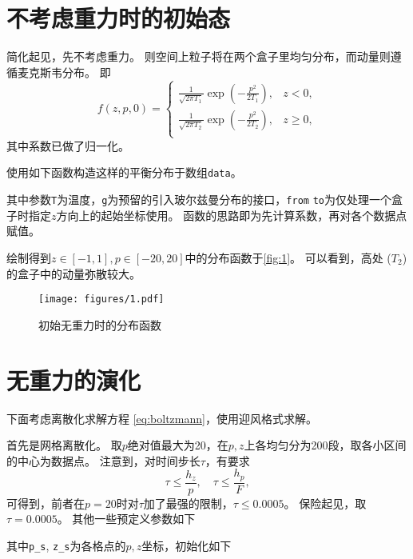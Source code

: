 \documentclass[a4paper,unicode]{report}
\begin{document}
\section{不考虑重力时的初始态}
简化起见，先不考虑重力。
则空间上粒子将在两个盒子里均匀分布，而动量则遵循麦克斯韦分布。
即
\begin{equation}
    f(z, p, 0) = \begin{cases}
        \frac{1}{\sqrt{2\pi T_1}}\exp(-\frac{p^2}{2T_1}), & z < 0,\\
        \frac{1}{\sqrt{2\pi T_2}}\exp(-\frac{p^2}{2T_2}), & z \ge 0,\\
    \end{cases}
\end{equation}
其中系数已做了归一化。

使用如下函数构造这样的平衡分布于数组\verb|data|。
{
    \linespread{1.0}
    
    
}
其中参数\verb|T|为温度，\verb|g|为预留的引入玻尔兹曼分布的接口，\verb|from| \verb|to|为仅处理一个盒子时指定$z$方向上的起始坐标使用。
函数的思路即为先计算系数，再对各个数据点赋值。

绘制得到$z\in [-1, 1], p\in [-20, 20]$中的分布函数于\autoref{fig:1}。
可以看到，高处 ($T_2$) 的盒子中的动量弥散较大。

\begin{figure}
    \centering
    \texttt{[image: figures/1.pdf]}
    \caption{初始无重力时的分布函数}
    \label{fig:1}
\end{figure}

\section{无重力的演化}
下面考虑离散化求解方程 \eqref{eq:boltzmann}，使用迎风格式求解。

首先是网格离散化。
取$p$绝对值最大为20，在$p, z$上各均匀分为200段，取各小区间的中心为数据点。
注意到，对时间步长$\tau$，有要求
\begin{equation}
    \tau \le \frac{h_z}{p}, \quad \tau \le \frac{h_p}{F},
\end{equation}
可得到，前者在$p=20$时对$\tau$加了最强的限制，$\tau\le 0.0005$。
保险起见，取$\tau = 0.0005$。
其他一些预定义参数如下
{
    \linespread{1.0}
    
}
其中\verb|p_s|, \verb|z_s|为各格点的$p, z$坐标，初始化如下
{
    \linespread{1.0}
    
}
\end{document}
